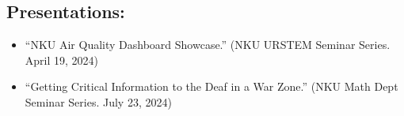 \documentclass{resume}
\begin{document}
\subsection{Presentations:}
\begin{itemize}[parsep=0.5ex]
  \item “NKU Air Quality Dashboard Showcase.” (NKU URSTEM Seminar Series. April 19, 2024)
  \item “Getting Critical Information to the Deaf in a War Zone.” (NKU Math Dept Seminar Series. July 23, 2024)
\end{itemize}


%
%
\end{document}
